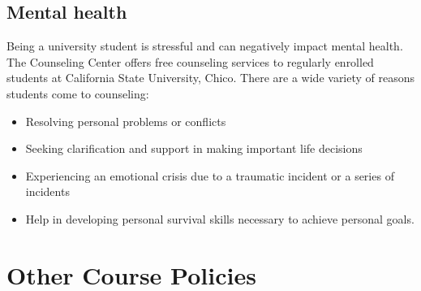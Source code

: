 \documentclass[11pt,]{article}
\providecommand{\tightlist}{%
  \setlength{\itemsep}{0pt}\setlength{\parskip}{0pt}}
\begin{document}
\hypertarget{mental-health}{%
\subsection{Mental health}\label{mental-health}}

Being a university student is stressful and can negatively impact mental
health. The Counseling Center offers free counseling services to
regularly enrolled students at California State University, Chico. There
are a wide variety of reasons students come to counseling:

\begin{itemize}
\tightlist
\item
  Resolving personal problems or conflicts
\item
  Seeking clarification and support in making important life decisions
\item
  Experiencing an emotional crisis due to a traumatic incident or a
  series of incidents
\item
  Help in developing personal survival skills necessary to achieve
  personal goals.
\end{itemize}

\hypertarget{other-course-policies}{%
\section{Other Course Policies}\label{other-course-policies}}
\end{document}
